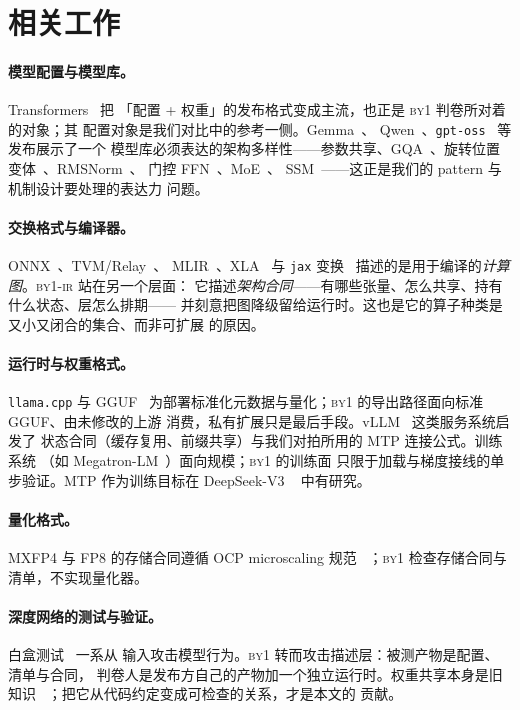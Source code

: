 \documentclass[11pt,a4paper]{ctexart}
\newcommand{\code}[1]{\texttt{#1}}
\newcommand{\byone}{\textsc{by1}}
\newcommand{\ir}{\textsc{by1-ir}}
\begin{document}
\section{相关工作}

\paragraph{模型配置与模型库。}Transformers~\cite{wolf2020transformers} 把
「配置 + 权重」的发布格式变成主流，也正是 \byone{} 判卷所对着的对象；其
配置对象是我们对比中的参考一侧。Gemma~\cite{gemma2024}、
Qwen~\cite{qwen2025qwen25}、\code{gpt-oss}~\cite{gptoss2025} 等发布展示了一个
模型库必须表达的架构多样性——参数共享、GQA~\cite{ainslie2023gqa}、旋转位置
变体~\cite{su2021roformer, peng2023yarn}、RMSNorm~\cite{zhang2019rmsnorm}、
门控 FFN~\cite{shazeer2020glu}、MoE~\cite{fedus2022switch}、
SSM~\cite{daogu2023mamba}——这正是我们的 pattern 与机制设计要处理的表达力
问题。

\paragraph{交换格式与编译器。}ONNX~\cite{onnx2019}、TVM/Relay~\cite{chen2018tvm}、
MLIR~\cite{lattner2021mlir}、XLA~\cite{abadi2016tensorflow} 与 \code{jax}
变换~\cite{jax2018} 描述的是用于编译的\emph{计算图}。\ir{} 站在另一个层面：
它描述\emph{架构合同}——有哪些张量、怎么共享、持有什么状态、层怎么排期——
并刻意把图降级留给运行时。这也是它的算子种类是又小又闭合的集合、而非可扩展
的原因。

\paragraph{运行时与权重格式。}\code{llama.cpp} 与 GGUF~\cite{llamacpp2023}
为部署标准化元数据与量化；\byone{} 的导出路径面向标准 GGUF、由未修改的上游
消费，私有扩展只是最后手段。vLLM~\cite{kwon2023vllm} 这类服务系统启发了
状态合同（缓存复用、前缀共享）与我们对拍所用的 MTP 连接公式。训练系统
（如 Megatron-LM~\cite{shoeybi2019megatron}）面向规模；\byone{} 的训练面
只限于加载与梯度接线的单步验证。MTP 作为训练目标在 DeepSeek-V3
~\cite{deepseekai2024deepseekv3} 中有研究。

\paragraph{量化格式。}MXFP4 与 FP8 的存储合同遵循 OCP microscaling 规范
~\cite{ocp2023mx}；\byone{} 检查存储合同与清单，不实现量化器。

\paragraph{深度网络的测试与验证。}白盒测试~\cite{pei2017deepxplore} 一系从
输入攻击模型行为。\byone{} 转而攻击描述层：被测产物是配置、清单与合同，
判卷人是发布方自己的产物加一个独立运行时。权重共享本身是旧知识
~\cite{presswolf2017using}；把它从代码约定变成可检查的关系，才是本文的
贡献。
\end{document}
